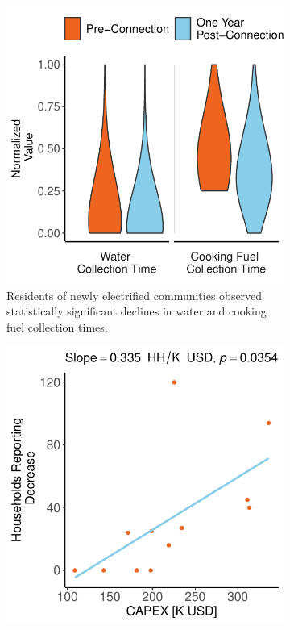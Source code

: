 \begin{figure}[t]
	\centering
	\begin{subfigure}[t]{0.48\textwidth}
		\centering
		\includegraphics[width=\textwidth]{images/gender_equality_paired_results.pdf}
		\caption{Residents of newly electrified communities observed statistically significant declines in water and cooking fuel collection times.}
		\label{fig:gender_equality_paired_results}
	\end{subfigure}
	\hfill
	\begin{subfigure}[t]{0.48\textwidth}
		\centering
		\includegraphics[width=\textwidth]{images/water_collection_time_regression_community.pdf}

\end{subfigure}
\end{figure}
